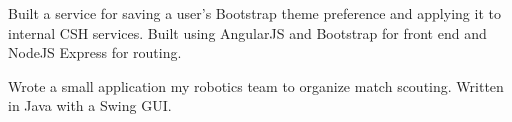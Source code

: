 \documentclass[10pt,a4paper]{altacv}
\begin{document}
Built a service for saving a user's Bootstrap theme preference and applying it to internal CSH services.
Built using AngularJS and Bootstrap for front end and NodeJS Express for routing.

\divider

Wrote a small application my robotics team to organize match scouting.
Written in Java with a Swing GUI.

\clearpage
\end{document}
